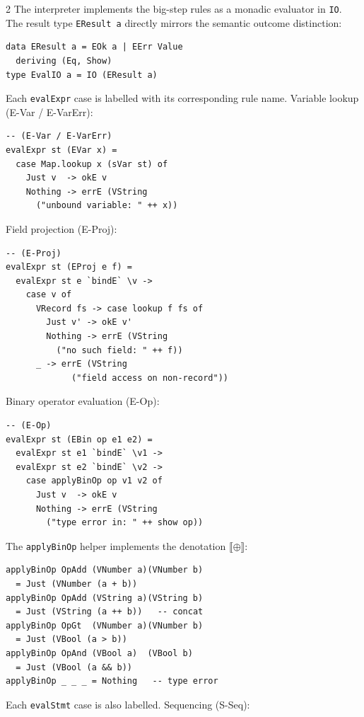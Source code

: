 \documentclass[10pt]{article}
\newcommand{\sem}[1]{\llbracket #1 \rrbracket}
\begin{document}
\begin{multicols}{2}
The interpreter implements the big-step rules as a monadic evaluator in
\texttt{IO}.  The result type \texttt{EResult~a} directly mirrors the
semantic outcome distinction:

\begin{lstlisting}[style=hs]
data EResult a = EOk a | EErr Value
  deriving (Eq, Show)
type EvalIO a = IO (EResult a)
\end{lstlisting}

Each \texttt{evalExpr} case is labelled with its corresponding rule
name.  Variable lookup (E-Var / E-VarErr):

\begin{lstlisting}[style=hs]
-- (E-Var / E-VarErr)
evalExpr st (EVar x) =
  case Map.lookup x (sVar st) of
    Just v  -> okE v
    Nothing -> errE (VString
      ("unbound variable: " ++ x))
\end{lstlisting}

Field projection (E-Proj):

\begin{lstlisting}[style=hs]
-- (E-Proj)
evalExpr st (EProj e f) =
  evalExpr st e `bindE` \v ->
    case v of
      VRecord fs -> case lookup f fs of
        Just v' -> okE v'
        Nothing -> errE (VString
          ("no such field: " ++ f))
      _ -> errE (VString
             ("field access on non-record"))
\end{lstlisting}

Binary operator evaluation (E-Op):

\begin{lstlisting}[style=hs]
-- (E-Op)
evalExpr st (EBin op e1 e2) =
  evalExpr st e1 `bindE` \v1 ->
  evalExpr st e2 `bindE` \v2 ->
    case applyBinOp op v1 v2 of
      Just v  -> okE v
      Nothing -> errE (VString
        ("type error in: " ++ show op))
\end{lstlisting}

The \texttt{applyBinOp} helper implements the denotation $\sem{\oplus}$:

\begin{lstlisting}[style=hs]
applyBinOp OpAdd (VNumber a)(VNumber b)
  = Just (VNumber (a + b))
applyBinOp OpAdd (VString a)(VString b)
  = Just (VString (a ++ b))   -- concat
applyBinOp OpGt  (VNumber a)(VNumber b)
  = Just (VBool (a > b))
applyBinOp OpAnd (VBool a)  (VBool b)
  = Just (VBool (a && b))
applyBinOp _ _ _ = Nothing   -- type error
\end{lstlisting}

Each \texttt{evalStmt} case is also labelled.  Sequencing (S-Seq):


\end{multicols}
\end{document}
